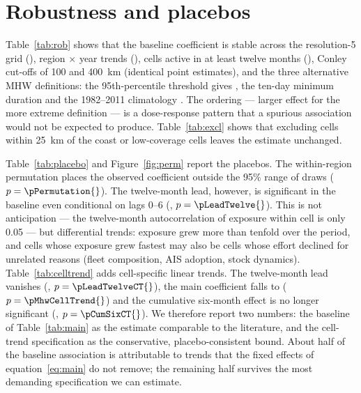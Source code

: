 \documentclass[12pt,a4paper]{article}
\begin{document}


\section{Robustness and placebos}\label{sec:rob}
Table~\ref{tab:rob} shows that the baseline coefficient is stable across the resolution-5 grid (\bResFive{}), region $\times$ year trends (\bTrendRegYear{}), cells active in at least twelve months (\bStableCells{}), Conley cut-offs of 100 and 400~km (identical point estimates), and the three alternative MHW definitions: the 95th-percentile threshold gives \bMhwPninetyfive{}, the ten-day minimum duration \bMhwDurTen{} and the 1982--2011 climatology \bMhwClimEarly{}. The ordering --- larger effect for the more extreme definition --- is a dose-response pattern that a spurious association would not be expected to produce. Table~\ref{tab:excl} shows that excluding cells within 25~km of the coast or low-coverage cells leaves the estimate unchanged.




Table~\ref{tab:placebo} and Figure~\ref{fig:perm} report the placebos. The within-region permutation places the observed coefficient outside the 95\% range of \nPermutations{} draws ($p=\pPermutation{}$). The twelve-month lead, however, is significant in the baseline even conditional on lags 0--6 (\bLeadTwelve{}, $p=\pLeadTwelve{}$). This is not anticipation --- the twelve-month autocorrelation of exposure within cell is only 0.05 --- but differential trends: exposure grew more than tenfold over the period, and cells whose exposure grew fastest may also be cells whose effort declined for unrelated reasons (fleet composition, AIS adoption, stock dynamics). Table~\ref{tab:celltrend} adds cell-specific linear trends. The twelve-month lead vanishes (\bLeadTwelveCT{}, $p=\pLeadTwelveCT{}$), the main coefficient falls to \bMhwCellTrend{} ($p=\pMhwCellTrend{}$) and the cumulative six-month effect is no longer significant (\bCumSixCT{}, $p=\pCumSixCT{}$). We therefore report two numbers: the baseline of Table~\ref{tab:main} as the estimate comparable to the literature, and the cell-trend specification as the conservative, placebo-consistent bound. About half of the baseline association is attributable to trends that the fixed effects of equation~\eqref{eq:main} do not remove; the remaining half survives the most demanding specification we can estimate.



\end{document}
